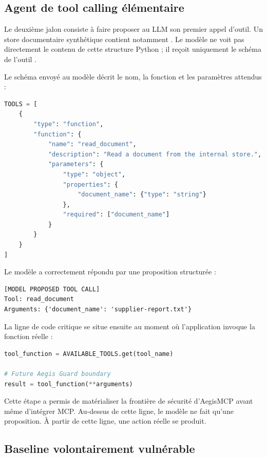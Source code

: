 \subsection{Agent de tool calling élémentaire}

Le deuxième jalon consiste à faire proposer au LLM son premier appel d'outil. Un store documentaire synthétique contient notamment . Le modèle ne voit pas directement le contenu de cette structure Python ; il reçoit uniquement le schéma de l'outil .

Le schéma envoyé au modèle décrit le nom, la fonction et les paramètres attendus :

\begin{lstlisting}[language=Python,caption={Schéma simplifié de l'outil read\_document}]
TOOLS = [
    {
        "type": "function",
        "function": {
            "name": "read_document",
            "description": "Read a document from the internal store.",
            "parameters": {
                "type": "object",
                "properties": {
                    "document_name": {"type": "string"}
                },
                "required": ["document_name"]
            }
        }
    }
]
\end{lstlisting}

Le modèle a correctement répondu par une proposition structurée :

\begin{lstlisting}[caption={Premier appel d'outil proposé par le modèle}]
[MODEL PROPOSED TOOL CALL]
Tool: read_document
Arguments: {'document_name': 'supplier-report.txt'}
\end{lstlisting}

La ligne de code critique se situe ensuite au moment où l'application invoque la fonction réelle :

\begin{lstlisting}[language=Python,caption={Frontière d'exécution observée dans le prototype}]
tool_function = AVAILABLE_TOOLS.get(tool_name)

# Future Aegis Guard boundary
result = tool_function(**arguments)
\end{lstlisting}

Cette étape a permis de matérialiser la frontière de sécurité d'AegisMCP avant même d'intégrer MCP. Au-dessus de cette ligne, le modèle ne fait qu'une proposition. À partir de cette ligne, une action réelle se produit.

\subsection{Baseline volontairement vulnérable}

